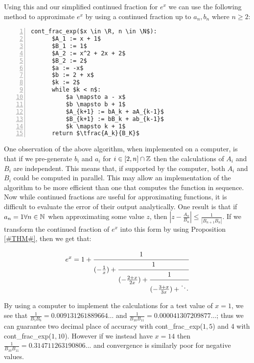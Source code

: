 Using this and our simplified continued fraction for \(e^x\) we can use the following method to approximate \(e^x\) by using a continued fraction up to \(a_n,b_n\) where \(n \ge 2\):
 
\begin{lstlisting}[numbers=left,frame=single,mathescape,caption={Continued fraction for \(e^x\)},label={PCD_"cont exp v1"}]
  cont_frac_exp($x \in \R, n \in \N$):
      $A_1 := x + 1$
      $B_1 := 1$
      $A_2 := x^2 + 2x + 2$
      $B_2 := 2$
      $a := -x$
      $b := 2 + x$
      $k := 2$
      while $k < n$:
          $a \mapsto a - x$
          $b \mapsto b + 1$
          $A_{k+1} := bA_k + aA_{k-1}$
          $B_{k+1} := bB_k + ab_{k-1}$
          $k \mapsto k + 1$
      return $\tfrac{A_k}{B_K}$
\end{lstlisting}

One observation of the above algorithm, when implemented on a computer, is that if we pre-generate \(b_i\) and \(a_i\) for \(i \in [2, n]\cap \mathbb{Z}\) then the calculations of \(A_i\) and \(B_i\) are independent. This means that, if supported by the computer, both \(A_i\) and \(B_i\) could be computed in parallel. This may allow an implementation of the algorithm to be more efficient than one that computes the function in sequence.\\

Now while continued fractions are useful for approximating functions, it is difficult to evaluate the error of their output analytically. One result is that if \(a_n = 1 \forall n \in \mathbb{N}\) when approximating some value \(z\), then \(|z - \tfrac{A_n}{B_n}| \le \frac{1}{|B_{n+1}B_n|}\). If we transform the continued fraction of \(e^x\) into this form by using Proposition \ref{#THM#}, then we get that:

\begin{displaymath}
	e^x = 1 + \cfrac{1}{(-\tfrac{1}{x}) + 
			  \cfrac{1}{(-\frac{2+x}{2x}) +
			  \cfrac{1}{(-\frac{3+x}{3x}) + \ddots } } }
\end{displaymath}

By using a computer to implement the calculations for a test value of \(x = 1\), we see that \(\frac{1}{B_5B_6} = 0.009131261889664\ldots\) and \(\frac{1}{B_{10}B_{11}} = 0.000041307209877\ldots\); thus we can guarantee two decimal place of accuracy with \textrm{cont\_frac\_exp(\(1, 5\))} and 4 with \textrm{cont\_frac\_exp(\(1, 10\))}. However if we instead have \(x = 14\) then \(\frac{1}{B_{10}B_{11}} = 0.314711263190806\ldots\) and convergence is similarly poor for negative values.\\
 
